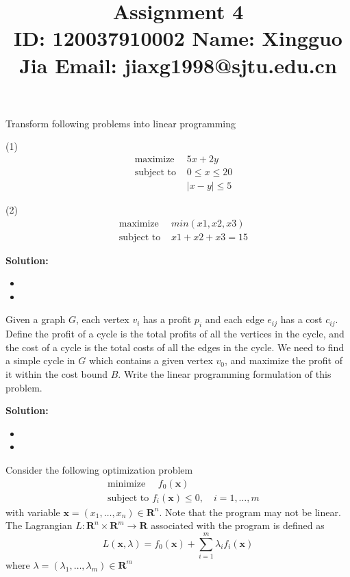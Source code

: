 \documentclass{article}
\title{{\bf Assignment 4} \\ {\large ID: 120037910002 } {\large Name: Xingguo Jia } {\large Email: jiaxg1998@sjtu.edu.cn}}
\author{}
\date{}
\newcounter{exercise}
\newcommand{\<}{
    \langle}
\renewcommand{\>}{
    \rangle}
\begin{document}
\maketitle


{\large

\begin{exercise}
	Transform following problems into linear programming
	
	(1)
		$$\begin{aligned}
		&\text { maximize } & 5x+2y\\
		&\text { subject to } & 0 \le x \le 20 \\
		& & |x - y|\le 5
		\end{aligned}$$
		
	(2)
		$$\begin{aligned}
		&\text { maximize }  & min(x1,x2,x3)\\
		&\text { subject to }  & x1+x2+x3 = 15
		\end{aligned}$$
\end{exercise}

\textbf{Solution:}
\begin{itemize}
    \item 
    \item 
\end{itemize}
\newpage


\begin{exercise}
	Given a graph $G$, each vertex $v_i$ has a profit $p_i$ and each edge $e_{ij}$ has a cost $c_{ij}$. Define the profit of a cycle is the total profits of all the vertices in the cycle, and the cost of a cycle is the total costs of all the edges in the cycle. We need to find a simple cycle in $G$ which contains a given vertex $v_0$, and maximize the profit of it within the cost bound $B$. Write the linear programming formulation of this problem.
\end{exercise}

\textbf{Solution:}
\begin{itemize}
    \item 
    \item 
\end{itemize}
\newpage




\begin{exercise}
	Consider the following optimization problem
	$$\begin{aligned}
		&\text { minimize } \quad f_{0}(\mathbf{x})\\
		&\text { subject to } f_{i}(\mathbf{x}) \leq 0, \quad i=1, \ldots, m
	\end{aligned}$$
	with variable $\mathbf{x}=\left(x_{1}, \ldots, x_{n}\right) \in \mathbf{R}^{n} .$ Note that the program may not be linear. The Lagrangian
	$L: \mathbf{R}^{n} \times \mathbf{R}^{m} \rightarrow \mathbf{R}$ associated with the program is defined as
	$$
	L(\mathbf{x}, \lambda)=f_{0}(\mathbf{x})+\sum_{i=1}^{m} \lambda_{i} f_{i}(\mathbf{x})
	$$
	where $\lambda=\left(\lambda_{1}, \ldots, \lambda_{m}\right) \in \mathbf{R}^{m}$
	

\end{exercise}}
\end{document}
